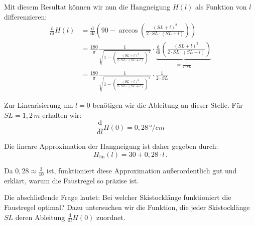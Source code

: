 Mit diesem Resultat können wir nun die Hangneigung $H(l)$ als Funktion von $l$ differenzieren:
\begin{align*}
	\frac{\mathrm{d}}{\mathrm{d}l}H(l)
	&=\frac{\mathrm{d}}{\mathrm{d}l}\left(90-\arccos\left(\frac{(SL+l)^2}{2 \cdot SL \cdot (SL+l)}\right)\right)\\
	&=\frac{180}{\pi}\frac{1}{\sqrt{1-\left(\frac{(SL+l)^2}{2 \cdot SL \cdot (SL+l)}\right)^2}} \cdot \underbrace{\frac{\mathrm{d}}{\mathrm{d}l}\left(\frac{(SL+l)^2}{2 \cdot SL \cdot (SL+l)}\right)}_{=\frac{1}{2 \cdot SL}}\\
	&=\frac{180}{\pi}\frac{1}{\sqrt{1-\left(\frac{(SL+l)^2}{2 \cdot SL \cdot (SL+l)}\right)^2}} \cdot \frac{1}{2 \cdot SL}
\end{align*}

Zur Linearisierung um $l=0$ benötigen wir die Ableitung an dieser Stelle. Für $SL=1{,}2 \, \unit{m}$ erhalten wir:
$$\frac{\mathrm{d}}{\mathrm{d}l}H(0)=0{,}28 \, \unit{\degree/cm}$$

Die lineare Approximation der Hangneigung ist daher gegeben durch:
\begin{equation*}
	H_{\text{lin}}(l)=30+0{,}28 \cdot l\,.
\end{equation*}

Da $0{,}28 \approx \frac{3}{10}$ ist, funktioniert diese Approximation außerordentlich gut und erklärt, warum die Faustregel so präzise ist.

Die abschließende Frage lautet: Bei welcher Skistocklänge funktioniert die Faustregel optimal? Dazu untersuchen wir die Funktion, die jeder Skistocklänge $SL$ deren Ableitung $\frac{\mathrm{d}}{\mathrm{d}l}H(0)$ zuordnet.


